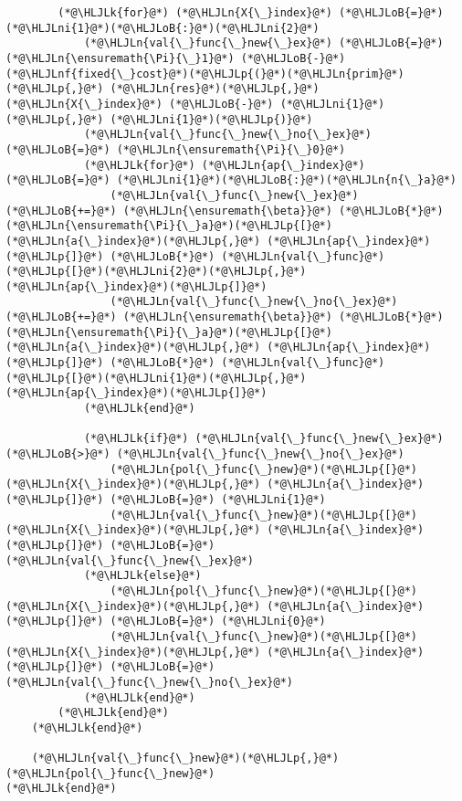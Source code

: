 \documentclass[12pt,a4paper]{article}
\newcommand{\HLJLk}[1]{\textcolor[RGB]{148,91,176}{\textbf{#1}}}
\newcommand{\HLJLn}[1]{#1}
\newcommand{\HLJLnf}[1]{\textcolor[RGB]{66,102,213}{#1}}
\newcommand{\HLJLni}[1]{\textcolor[RGB]{59,151,46}{#1}}
\newcommand{\HLJLoB}[1]{\textcolor[RGB]{102,102,102}{\textbf{#1}}}
\newcommand{\HLJLp}[1]{#1}
\begin{document}
\begin{lstlisting}
        (*@\HLJLk{for}@*) (*@\HLJLn{X{\_}index}@*) (*@\HLJLoB{=}@*) (*@\HLJLni{1}@*)(*@\HLJLoB{:}@*)(*@\HLJLni{2}@*)
            (*@\HLJLn{val{\_}func{\_}new{\_}ex}@*) (*@\HLJLoB{=}@*) (*@\HLJLn{\ensuremath{\Pi}{\_}1}@*) (*@\HLJLoB{-}@*) (*@\HLJLnf{fixed{\_}cost}@*)(*@\HLJLp{(}@*)(*@\HLJLn{prim}@*)(*@\HLJLp{,}@*) (*@\HLJLn{res}@*)(*@\HLJLp{,}@*) (*@\HLJLn{X{\_}index}@*) (*@\HLJLoB{-}@*) (*@\HLJLni{1}@*)(*@\HLJLp{,}@*) (*@\HLJLni{1}@*)(*@\HLJLp{)}@*)
            (*@\HLJLn{val{\_}func{\_}new{\_}no{\_}ex}@*) (*@\HLJLoB{=}@*) (*@\HLJLn{\ensuremath{\Pi}{\_}0}@*)
            (*@\HLJLk{for}@*) (*@\HLJLn{ap{\_}index}@*) (*@\HLJLoB{=}@*) (*@\HLJLni{1}@*)(*@\HLJLoB{:}@*)(*@\HLJLn{n{\_}a}@*)
                (*@\HLJLn{val{\_}func{\_}new{\_}ex}@*) (*@\HLJLoB{+=}@*) (*@\HLJLn{\ensuremath{\beta}}@*) (*@\HLJLoB{*}@*) (*@\HLJLn{\ensuremath{\Pi}{\_}a}@*)(*@\HLJLp{[}@*)(*@\HLJLn{a{\_}index}@*)(*@\HLJLp{,}@*) (*@\HLJLn{ap{\_}index}@*)(*@\HLJLp{]}@*) (*@\HLJLoB{*}@*) (*@\HLJLn{val{\_}func}@*)(*@\HLJLp{[}@*)(*@\HLJLni{2}@*)(*@\HLJLp{,}@*) (*@\HLJLn{ap{\_}index}@*)(*@\HLJLp{]}@*)
                (*@\HLJLn{val{\_}func{\_}new{\_}no{\_}ex}@*) (*@\HLJLoB{+=}@*) (*@\HLJLn{\ensuremath{\beta}}@*) (*@\HLJLoB{*}@*) (*@\HLJLn{\ensuremath{\Pi}{\_}a}@*)(*@\HLJLp{[}@*)(*@\HLJLn{a{\_}index}@*)(*@\HLJLp{,}@*) (*@\HLJLn{ap{\_}index}@*)(*@\HLJLp{]}@*) (*@\HLJLoB{*}@*) (*@\HLJLn{val{\_}func}@*)(*@\HLJLp{[}@*)(*@\HLJLni{1}@*)(*@\HLJLp{,}@*) (*@\HLJLn{ap{\_}index}@*)(*@\HLJLp{]}@*)
            (*@\HLJLk{end}@*)

            (*@\HLJLk{if}@*) (*@\HLJLn{val{\_}func{\_}new{\_}ex}@*) (*@\HLJLoB{>}@*) (*@\HLJLn{val{\_}func{\_}new{\_}no{\_}ex}@*)
                (*@\HLJLn{pol{\_}func{\_}new}@*)(*@\HLJLp{[}@*)(*@\HLJLn{X{\_}index}@*)(*@\HLJLp{,}@*) (*@\HLJLn{a{\_}index}@*)(*@\HLJLp{]}@*) (*@\HLJLoB{=}@*) (*@\HLJLni{1}@*)
                (*@\HLJLn{val{\_}func{\_}new}@*)(*@\HLJLp{[}@*)(*@\HLJLn{X{\_}index}@*)(*@\HLJLp{,}@*) (*@\HLJLn{a{\_}index}@*)(*@\HLJLp{]}@*) (*@\HLJLoB{=}@*) (*@\HLJLn{val{\_}func{\_}new{\_}ex}@*)
            (*@\HLJLk{else}@*)
                (*@\HLJLn{pol{\_}func{\_}new}@*)(*@\HLJLp{[}@*)(*@\HLJLn{X{\_}index}@*)(*@\HLJLp{,}@*) (*@\HLJLn{a{\_}index}@*)(*@\HLJLp{]}@*) (*@\HLJLoB{=}@*) (*@\HLJLni{0}@*)
                (*@\HLJLn{val{\_}func{\_}new}@*)(*@\HLJLp{[}@*)(*@\HLJLn{X{\_}index}@*)(*@\HLJLp{,}@*) (*@\HLJLn{a{\_}index}@*)(*@\HLJLp{]}@*) (*@\HLJLoB{=}@*) (*@\HLJLn{val{\_}func{\_}new{\_}no{\_}ex}@*)
            (*@\HLJLk{end}@*)
        (*@\HLJLk{end}@*)
    (*@\HLJLk{end}@*)

    (*@\HLJLn{val{\_}func{\_}new}@*)(*@\HLJLp{,}@*) (*@\HLJLn{pol{\_}func{\_}new}@*)
(*@\HLJLk{end}@*)


\end{lstlisting}
\end{document}
